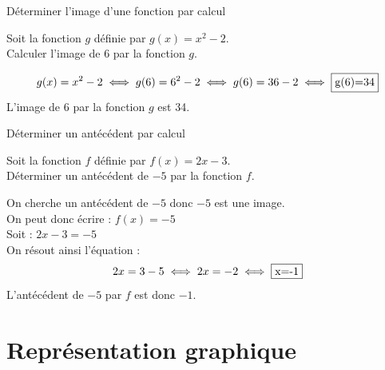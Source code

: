 \begin{bmethodet}{Déterminer l'image d'une fonction par calcul}
	
	Soit la fonction \(g\) définie par \(g(x)=x^{2}-2\).\\
	Calculer l'image de 6 par la fonction \(g\).
	
	$$g(x)=x^{2}-2 \iff g(6)=6^{2}-2 \iff g(6)=36-2 \iff \fbox{g(6)=34}$$
	L'image de 6 par la fonction \(g\) est 34.
\end{bmethodet}


\begin{bmethodet}{Déterminer un antécédent par calcul}
	
	Soit la fonction \(f\) définie par \(f(x)=2 x-3\).\\
	Déterminer un antécédent de $-5$ par la fonction \(f\).
	
	
	On cherche un antécédent de $-5$ donc $-5$ est une image.\\
	On peut donc écrire : \(f(x)=-5\)\\
	Soit : \(2 x-3=-5\)\\
	On résout ainsi l'équation :
	$$2 x=3-5 \iff 2 x=-2 \iff \fbox{x=-1}$$
	L'antécédent de $-5$ par \(f\) est donc $-1$.
\end{bmethodet}

\section{Représentation graphique}

